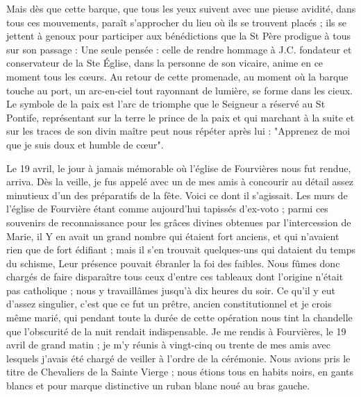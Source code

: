 \documentclass[11pt,a4paper]{report}
\begin{document}
Mais dès que cette barque, que tous les yeux suivent avec une pieuse avidité, dans tous ces mouvements, paraît s'approcher du lieu où ils se trouvent placés ; ils se jettent à genoux pour participer aux bénédictions que la St Père prodigue à tous sur son passage : Une seule pensée : celle de rendre hommage à J.C. fondateur et conservateur de la Ste Église, dans la personne de son vicaire, anime en ce moment tous les cœurs. Au retour de cette promenade, au moment où la barque touche au port, un arc-en-ciel tout rayonnant de lumière, se forme dans les cieux. Le symbole de la paix est l'arc de triomphe que le Seigneur a réservé au St Pontife, représentant sur la terre le prince de la paix et qui marchant à la suite et sur les traces de son divin maître peut nous répéter après lui : "Apprenez de moi que je suis doux et humble de cœur".

Le 19 avril, le jour à jamais mémorable où l'église de Fourvières nous fut rendue, arriva. Dès la veille, je fus appelé avec un de mes amis à concourir au détail assez minutieux d'un des préparatifs de la fête. Voici ce dont il s'agissait. Les murs de l'église de Fourvière étant comme aujourd'hui tapissés d'ex-voto ; parmi ces souvenirs de reconnaissance pour les grâces divines obtenues par l'intercession de Marie, il Y en avait un grand nombre qui étaient fort anciens, et qui n'avaient rien que de fort édifiant ; mais il s'en trouvait quelques-uns qui dataient du temps du schisme, Leur présence pouvait ébranler la foi des faibles. Nous fûmes donc chargés de faire disparaître tous ceux d'entre ces tableaux dont l'origine n'était pas catholique ; nous y travaillâmes jusqu'à dix heures du soir. Ce qu'il y eut d'assez singulier, c'est que ce fut un prêtre, ancien constitutionnel et je crois même marié, qui pendant toute la durée de cette opération nous tint la chandelle que l'obscurité de la nuit rendait indispensable. Je me rendis à Fourvières, le 19 avril de grand matin ; je m'y réunis à vingt-cinq ou trente de mes amis avec lesquels j'avais été chargé de veiller à l'ordre de la cérémonie. Nous avions pris le titre de Chevaliers de la Sainte Vierge ; nous étions tous en habits noirs, en gants blancs et pour marque distinctive un ruban blanc noué au bras gauche.
\end{document}

